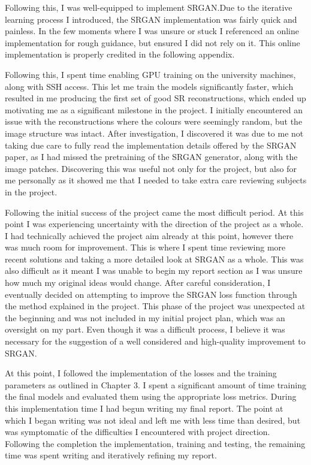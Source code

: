 \begin{appendices}
Following this, I was well-equipped to implement SRGAN.\@ Due to the iterative learning process I introduced, the SRGAN implementation was fairly quick and painless. In the few moments where I was unsure or stuck I referenced an online implementation for rough guidance, but ensured I did not rely on it. This online implementation is properly credited in the following appendix.

Following this, I spent time enabling GPU training on the university machines, along with SSH access. This let me train the models significantly faster, which resulted in me producing the first set of good SR reconstructions, which ended up motivating me as a significant milestone in the project. I initially encountered an issue with the reconstructions where the colours were seemingly random, but the image structure was intact. After investigation, I discovered it was due to me not taking due care to fully read the implementation details offered by the SRGAN paper, as I had missed the pretraining of the SRGAN generator, along with the image patches. Discovering this was useful not only for the project, but also for me personally as it showed me that I needed to take extra care reviewing subjects in the project.

Following the initial success of the project came the most difficult period. At this point I was experiencing uncertainty with the direction of the project as a whole. I had technically achieved the project aim already at this point, however there was much room for improvement. This is where I spent time reviewing more recent solutions and taking a more detailed look at SRGAN as a whole. This was also difficult as it meant I was unable to begin my report section as I was unsure how much my original ideas would change. After careful consideration, I eventually decided on attempting to improve the SRGAN loss function through the method explained in the project. This phase of the project was unexpected at the beginning and was not included in my initial project plan, which was an oversight on my part. Even though it was a difficult process, I believe it was necessary for the suggestion of a well considered and high-quality improvement to SRGAN.\@

At this point, I followed the implementation of the losses and the training parameters as outlined in Chapter 3. I spent a significant amount of time training the final models and evaluated them using the appropriate loss metrics. During this implementation time I had begun writing my final report. The point at which I began writing was not ideal and left me with less time than desired, but was symptomatic of the difficulties I encountered with project direction. Following the completion the implementation, training and testing, the remaining time was spent writing and iteratively refining my report.


\end{appendices}
